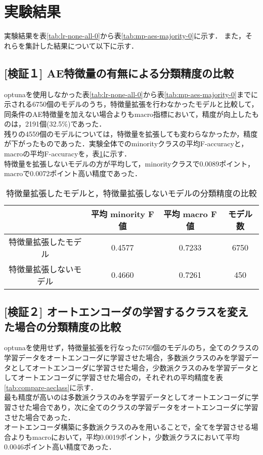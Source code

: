\section{実験結果}
実験結果を表\ref{tab:lr-none-all-0}から表\ref{tab:mp-aes-majority-0}に示す．
また，それらを集計した結果について以下に示す．

\subsection{[検証１] AE特徴量の有無による分類精度の比較}

optunaを使用しなかった表\ref{tab:lr-none-all-0}から表\ref{tab:mp-aes-majority-0}までに示される6750個のモデルのうち，特徴量拡張を行わなかったモデルと比較して，同条件のAE特徴量を加えない場合よりもmacro指標において，精度が向上したものは，2191個(32.5\%)であった．\\
残りの4559個のモデルについては，特徴量を拡張しても変わらなかったか，精度が下がったものであった．実験全体でのminorityクラスの平均F-accuracyと，macroの平均F-accuracyを，表\ref{tab:compare-avg-f1}に示す．\\
特徴量を拡張しないモデルの方が平均して，minorityクラスで0.0089ポイント，macroで0.0072ポイント高い精度であった．\\



\begin{table}[htbp]
\caption{特徴量拡張したモデルと，特徴量拡張しないモデルの分類精度の比較}
\label{tab:compare-avg-f1}
\centering
\begin{tabular}{cccc}
    \hline
    & 平均 minority F値 & 平均 macro F値 & モデル数  \\ 
    \hline
    特徴量拡張したモデル  & 0.4577& 0.7233& 6750 \\ 
    特徴量拡張しないモデル & 0.4660& 0.7261& 450  \\ 
    \hline
\end{tabular}
\end{table}

\subsection{[検証２] オートエンコーダの学習するクラスを変えた場合の分類精度の比較}
optunaを使用せず，特徴量拡張を行なった6750個のモデルのち，全てのクラスの学習データをオートエンコーダに学習させた場合，多数派クラスのみを学習データとしてオートエンコーダに学習させた場合，少数派クラスのみを学習データとしてオートエンコーダに学習させた場合の，それぞれの平均精度を表\ref{tab:compare-aeclass}に示す．\\
最も精度が高いのは多数派クラスのみを学習データとしてオートエンコーダに学習させた場合であり，次に全てのクラスの学習データをオートエンコーダに学習させた場合であった．\\
オートエンコーダ構築に多数派クラスのみを用いることで，全てを学習させる場合よりもmacroにおいて，平均0.0019ポイント，少数派クラスにおいて平均0.0046ポイント高い精度であった．\\


